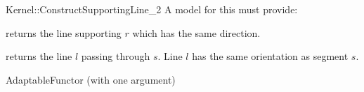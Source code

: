 \begin{ccRefFunctionObjectConcept}{Kernel::ConstructSupportingLine_2}
A model for this must provide:


       {returns the line supporting $r$ which has the same direction.}

       {returns the line $l$ passing through $s$. Line $l$  has the
        same orientation as segment $s$.}

\ccRefines
AdaptableFunctor (with one argument)

\ccSeeAlso
{} \\
\\

\end{ccRefFunctionObjectConcept}
